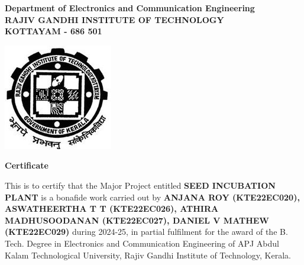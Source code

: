 \begin{center}

    {
        \large \bfseries
        Department of Electronics and Communication Engineering \\
        \vspace{10pt}
        RAJIV GANDHI INSTITUTE OF TECHNOLOGY \\
        \vspace{5pt}
        KOTTAYAM - 686 501 \\
        \vspace{5pt}
    }

    \vspace{50pt}

    \includegraphics {clg_logo.jpg}

    \vspace{40pt}

    {
        \huge \bfseries
        Certificate
    }

    \vspace{40pt}

    \begin{minipage} {0.9\textwidth}
        {
            \large
            This is to certify that the Major Project entitled
            \textbf{SEED INCUBATION PLANT}
            is a bonafide work carried out by
            \textbf{
                ANJANA ROY (KTE22EC020),
                ASWATHEERTHA T T (KTE22EC026),
                ATHIRA MADHUSOODANAN (KTE22EC027),
                DANIEL V MATHEW (KTE22EC029)
            }
            during 2024-25, in partial
            fulfilment for the award of the B. Tech. Degree in Electronics and
            Communication Engineering of APJ Abdul Kalam Technological
            University, Rajiv Gandhi Institute of Technology, Kerala.
        }
    \end{minipage}

    \vspace{30pt}

    \begin{tikzpicture} []


\end{tikzpicture}
\end{center}

